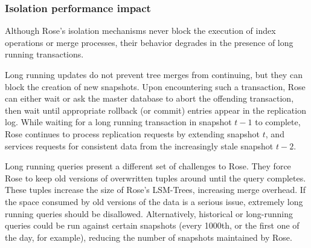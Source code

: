 \documentclass{vldb}
\newcommand{\rows}{Rose\xspace}
\newcommand{\rowss}{Rose's\xspace}
\begin{document}
\subsubsection{Isolation performance impact}

Although \rowss isolation mechanisms never block the execution of
index operations or merge processes, their behavior degrades in the presence of long
running transactions.

Long running updates do not prevent tree merges from continuing,
but they can block the creation of new snapshots.  Upon
encountering such a transaction, \rows can either wait or ask the
master database to abort the offending transaction, then wait until
appropriate rollback (or commit) entries appear in the replication
log.  While waiting for a long running transaction in snapshot $t-1$
to complete, \rows continues to process replication requests by
extending snapshot $t$, and services requests for consistent data from
the increasingly stale snapshot $t-2$.



Long running queries present a different set of challenges to \rows.
They force \rows to keep old versions of overwritten tuples around
until the query completes.  These tuples increase the size of \rowss
LSM-Trees, increasing merge overhead.  If the space consumed by old
versions of the data is a serious issue, extremely long running
queries should be disallowed.  Alternatively, historical or
long-running queries could be run against certain snapshots (every
1000th, or the first one of the day, for example), reducing the
number of snapshots maintained by \rows.
\end{document}
